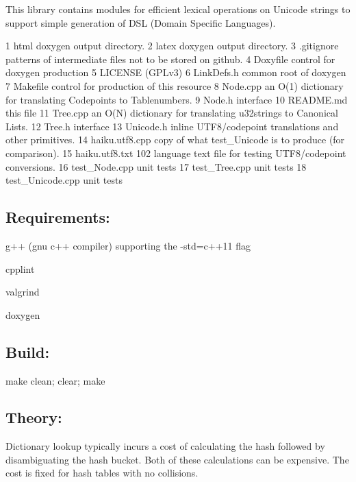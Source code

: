 This library contains modules for efficient lexical operations on Unicode strings to support simple generation of D\+S\+L (Domain Specific Languages).


\begin{DoxyCode}
1 html        doxygen output directory.
2 latex       doxygen output directory.
3 .gitignore  patterns of intermediate files not to be stored on github.
4 Doxyfile    control for doxygen production
5 LICENSE     (GPLv3)
6 LinkDefs.h  common root of doxygen
7 Makefile    control for production of this resource
8 Node.cpp    an O(1) dictionary for translating Codepoints to Tablenumbers.
9 Node.h      interface
10 README.md   this file
11 Tree.cpp    an O(N) dictionary for translating u32strings to Canonical Lists.
12 Tree.h      interface
13 Unicode.h   inline UTF8/codepoint translations and other primitives.
14 haiku.utf8.cpp  copy of what test\_Unicode is to produce (for comparison).
15 haiku.utf8.txt  102 language text file for testing UTF8/codepoint conversions.
16 test\_Node.cpp       unit tests
17 test\_Tree.cpp       unit tests
18 test\_Unicode.cpp    unit tests
\end{DoxyCode}


\subsection*{Requirements\+:}


\begin{DoxyItemize}
\item g++ (gnu c++ compiler) supporting the -\/std=c++11 flag
\item cpplint
\item valgrind
\item doxygen
\end{DoxyItemize}

\subsection*{Build\+:}


\begin{DoxyItemize}
\item make clean; clear; make
\end{DoxyItemize}

\subsection*{Theory\+:}

Dictionary lookup typically incurs a cost of calculating the hash followed by disambiguating the hash bucket. Both of these calculations can be expensive. The cost is fixed for hash tables with no collisions.

